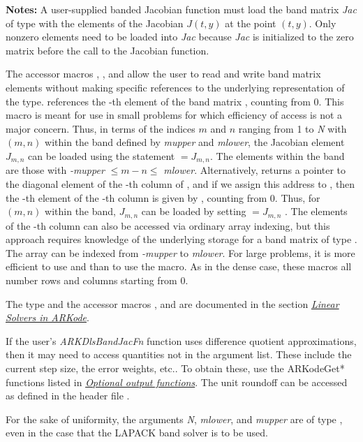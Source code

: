 \documentclass[letterpaper,10pt,english]{sphinxmanual}
\begin{document}
\begin{fulllineitems}
\textbf{Notes:} A user-supplied banded Jacobian function must load the band
matrix \emph{Jac} of type  with the elements of the Jacobian
$J(t,y)$ at the point $(t,y)$. Only nonzero elements
need to be loaded into \emph{Jac} because \emph{Jac} is initialized to
the zero matrix before the call to the Jacobian function.

The accessor macros , , and
 allow the user to read and write band matrix
elements without making specific references to the underlying
representation of the  type.  
references the -th element of the band matrix ,
counting from 0. This macro is meant for use in small problems for
which efficiency of access is not a major concern. Thus, in terms
of the indices $m$ and $n$ ranging from 1 to \emph{N} with
$(m, n)$ within the band defined by \emph{mupper} and
\emph{mlower}, the Jacobian element $J_{m,n}$ can be loaded
using the statement  $=
J_{m,n}$. The elements within the band are those with \emph{-mupper}
$\le m-n \le$ \emph{mlower}.  Alternatively, 
returns a pointer to the diagonal element of the -th column of
, and if we assign this address to , then
the -th element of the -th column is given by
, counting from 0. Thus, for
$(m,n)$ within the band, $J_{m,n}$ can be loaded by
setting  $= J_{m,n}$ . The elements of the -th column can
also be accessed via ordinary array indexing, but this approach
requires knowledge of the underlying storage for a band matrix of
type . The array  can be indexed from
\emph{-mupper} to \emph{mlower}. For large problems, it is more efficient
to use  and  than to use the
 macro. As in the dense case, these macros all number
rows and columns starting from 0.

The  type and the accessor macros ,
 and  are documented in the section
{\hyperref[linear_solvers/index:linearsolvers]{\emph{Linear Solvers in ARKode}}}.

If the user's \emph{ARKDlsBandJacFn} function uses difference quotient
approximations, then it may need to access quantities not in the
argument list.  These include the current step size, the error
weights, etc.. To obtain these, use the ARKodeGet* functions
listed in {\hyperref[c_interface/User_callable:cinterface-optionaloutputs]{\emph{Optional output functions}}}. The unit roundoff
can be accessed as  defined in the header file
.

For the sake of uniformity, the arguments \emph{N}, \emph{mlower}, and
\emph{mupper} are of type , even in the case that the
LAPACK band solver is to be used.

\end{fulllineitems}
\end{document}
